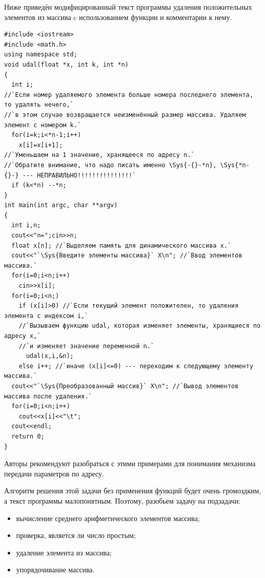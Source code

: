 Ниже приведён модифицированный текст программы удаления положительных элементов из массива  c
использованием функции  и комментарии к нему.
\begin{lstlisting}
#include <iostream>
#include <math.h>
using namespace std;
void udal(float *x, int k, int *n)
{
  int i;
//`Если номер удаляемого элемента больше номера последнего элемента, то удалять нечего,`
//`в этом случае возвращается неизменённый размер массива. Удаляем элемент с номером k.`
  for(i=k;i<*n-1;i++)
    x[i]=x[i+1];
//`Уменьшаем на 1 значение, хранящееся по адресу n.`
//`Обратите внимание, что надо писать именно \Sys{-{}-*n}, \Sys{*n-{}-} --- НЕПРАВИЛЬНО!!!!!!!!!!!!!!!`
  if (k<*n) --*n;
}
int main(int argc, char **argv)
{
  int i,n;
  cout<<"n=";cin>>n;
  float x[n]; //`Выделяем память для динамического массива x.`
  cout<<"`\Sys{Введите элементы массива}` X\n"; //`Ввод элементов массива.`
  for(i=0;i<n;i++)
    cin>>x[i];
  for(i=0;i<n;)
    if (x[i]>0) //`Если текущий элемент положителен, то удаления элемента с индексом i,` 
    //`Вызываем функцию udal, которая изменяет элементы, хранящиеся по адресу x,`
    //`и изменяет значение переменной n.`
      udal(x,i,&n);
    else i++; //`иначе (x[i]<=0) --- переходим к следующему элементу массива.`
  cout<<"`\Sys{Преобразованный массив}` X\n"; //`Вывод элементов массива после удаления.`
  for(i=0;i<n;i++)
    cout<<x[i]<<"\t";
  cout<<endl;
  return 0;
}
\end{lstlisting}

Авторы рекомендуют разобраться с этими примерами для понимания механизма передачи параметров по адресу.


Алгоритм решения этой задачи без применения функций будет очень громоздким, а текст программы малопонятным. Поэтому,
разобьем задачу на подзадачи:

\begin{itemize}
\item вычисление среднего арифметического элементов массива;
\item проверка, является ли число простым;
\item удаление элемента из массива;
\item упорядочивание массива.
\end{itemize}

